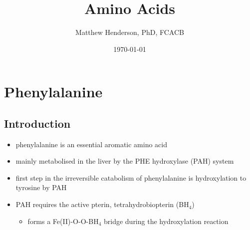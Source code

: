 \documentclass{scrartcl}
\author{Matthew Henderson, PhD, FCACB}
\date{\today}
\title{Amino Acids}
\begin{document}
\maketitle
\setcounter{tocdepth}{2}
\tableofcontents


\section{Phenylalanine}
\label{sec:org21918dc}
\subsection{Introduction}
\label{sec:org41fe07b}
\begin{itemize}
\item phenylalanine is an essential aromatic amino acid
\item mainly metabolised in the liver by the PHE hydroxylase (PAH) system
\item first step in the irreversible catabolism of phenylalanine is hydroxylation to
tyrosine by PAH
\item PAH requires the active pterin, tetrahydrobiopterin (BH\(_{\text{4}}\))
\begin{itemize}
\item forms a Fe(II)-O-O-BH\(_{\text{4}}\) bridge during the hydroxylation reaction
\end{itemize}
\end{itemize}
\end{document}
